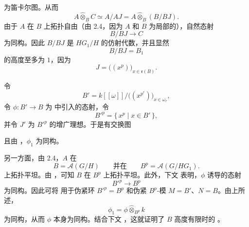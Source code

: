 \noindent
为笛卡尔图。从而
\[
  A\widehat\otimes_BC
  \simeq
  A/AJ
  =
  A\widehat\otimes_B(B/BJ).
\]
由于 \(A\) 在 \(B\) 上拓扑自由\textup{（由 2.4，因为 \(A\) 和 \(B\) 为局部的）}，自然态射
\[
  B/BJ\longrightarrow C
\]
为同构。因此 \(B/BJ\) 是 \(HG_1/H\) 的仿射代数，并且显然
\[
  B/BJ=B_1
\]
的高度至多为 \(1\)，因为
\[
  J=\bigl((x^p)\bigr)_{x\in\mathfrak r(B)}.
\]

令
\[
  B'
  =
  k[[\omega]]
  \big/
  \bigl((x^{p^r})\bigr)_{x\in\omega_r},
\]
令 \(\phi:B'\to B\) 为  中引入的态射，令
\[
  B'^p=\{\,x^p\mid x\in B'\,\},
\]
并令 \(J'\) 为 \(B'^p\) 的增广理想。于是有交换图

\begin{figure}[H]
  \centering
  
\end{figure}

\noindent
且由 ，\(\phi_1\) 为同构。

另一方面，由 2.4，\(A\) 在
\[
  B=\mathscr A(G/H)
  \qquad\text{并在}\qquad
  B^p=\mathscr A(G/HG_1).
\]
上拓扑平坦。由 ，可知 \(B\) 在 \(B^p\) 上拓扑平坦。此外，下文  表明，\(\phi\) 诱导的态射
\[
  B'^p\longrightarrow B^p
\]
为同构。因此可将  用于伪紧环 \(B'^p=B^p\) 和伪紧 \(B^p\)-模 \(M=B'\)、\(N=B\)。由上所述，
\[
  \phi_1
  =
  \phi\widehat\otimes_{B^p}k
\]
为同构，从而 \(\phi\) 本身为同构。结合下文 ，这就证明了 \(B\) 高度有限时的 。
